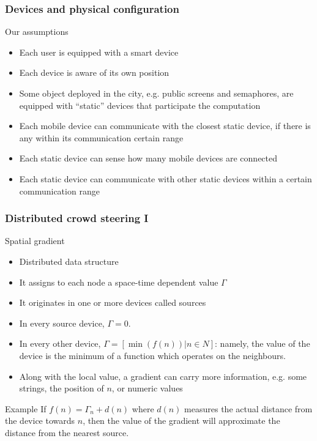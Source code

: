 \documentclass[presentation]{beamer}
\begin{document}
\begin{frame}\frametitle{Devices and physical configuration}
  \begin{block}{Our assumptions}
    \begin{itemize}
     \item Each user is equipped with a smart device
     \item Each device is aware of its own position
     \item Some object deployed in the city, e.g. public screens and semaphores, are equipped with ``static'' devices that participate the computation
     \item Each mobile device can communicate with the closest static device, if there is any within its communication certain range
     \item Each static device can sense how many mobile devices are connected
     \item Each static device can communicate with other static devices within a certain communication range
    \end{itemize}
  \end{block}
\end{frame}

\begin{frame}\frametitle{Distributed crowd steering I}
  \begin{block}{Spatial gradient}
    \begin{itemize}
     \item Distributed data structure
     \item It assigns to each node a space-time dependent value $\varGamma$
     \item It originates in one or more devices called sources
     \item In every source device, $\varGamma=0$.
     \item In every other device, $\varGamma=[\min(f(n)) | n \in N]$: namely, the value of the device is the minimum of a function which operates on the neighbours.
     \item Along with the local value, a gradient can carry more information, e.g. some strings, the position of $n$, or numeric values
    \end{itemize}
  \end{block}
  \begin{block}{Example}
    If $f(n) = \varGamma_{n} +d(n)$ where $d(n)$ measures the actual distance from the device towards $n$, then the value of the gradient will approximate the distance from the nearest source.
  \end{block}
\end{frame}
\end{document}
